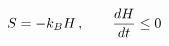 \documentclass[preview]{standalone}
\begin{document}
\begin{align*}
\special{dvisvgm:raw <g id='unique000'>}S=-k_B H\,,\qquad \dv{H}{t}\le 0\special{dvisvgm:raw </g>}
\end{align*}
\end{document}
